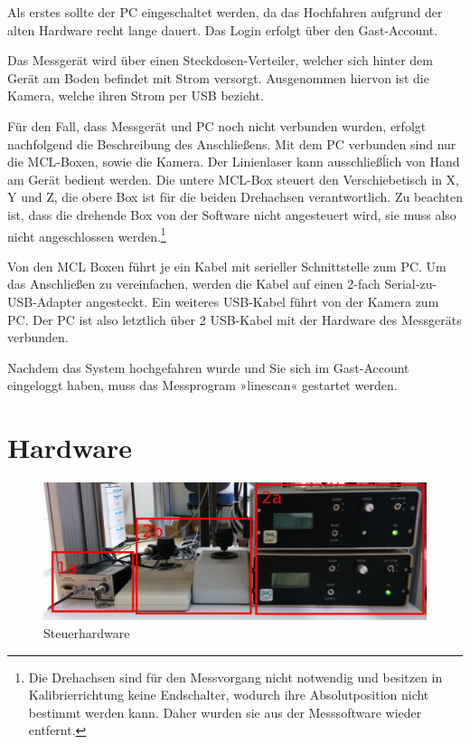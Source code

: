 \documentclass[a4paper,10pt]{scrartcl}
\begin{document}
Als erstes sollte der PC eingeschaltet werden, da das Hochfahren aufgrund der alten Hardware
recht lange dauert. Das Login erfolgt über den Gast-Account.

Das Messgerät wird über einen Steckdosen-Verteiler, welcher sich hinter dem Gerät am Boden befindet
mit Strom versorgt. Ausgenommen hiervon ist die Kamera, welche ihren Strom per USB bezieht.

Für den Fall, dass Messgerät und PC noch nicht verbunden wurden, erfolgt nachfolgend die Beschreibung
des Anschließens. Mit dem PC verbunden sind nur die MCL-Boxen, sowie die Kamera. Der Linienlaser kann
ausschließĺich von Hand am Gerät bedient werden. Die untere MCL-Box steuert den Verschiebetisch in X, Y
und Z, die obere Box ist für die beiden Drehachsen verantwortlich. Zu beachten ist, dass die drehende
Box von der Software nicht angesteuert wird, sie muss also nicht angeschlossen werden.\footnote{
Die Drehachsen sind für den Messvorgang nicht notwendig und besitzen in Kalibrierrichtung keine
Endschalter, wodurch ihre Absolutposition nicht bestimmt werden kann. Daher wurden sie aus der
Messsoftware wieder entfernt.}

Von den MCL Boxen führt je ein Kabel mit serieller Schnittstelle zum PC. Um das Anschließen zu
vereinfachen, werden die Kabel auf einen 2-fach Serial-zu-USB-Adapter angesteckt. Ein weiteres
USB-Kabel führt von der Kamera zum PC. Der PC ist also letztlich über 2 USB-Kabel mit der Hardware
des Messgeräts verbunden.

Nachdem das System hochgefahren wurde und Sie sich im Gast-Account eingeloggt haben, muss das
Messprogram »linescan« gestartet werden.

\section{Hardware}

\begin{figure}[h]
  \centering
  \includegraphics[width=\textwidth]{include/IMG_20160412_140339.jpg}
  \caption{Steuerhardware}
  \label{fig:overview}
\end{figure}
\end{document}
